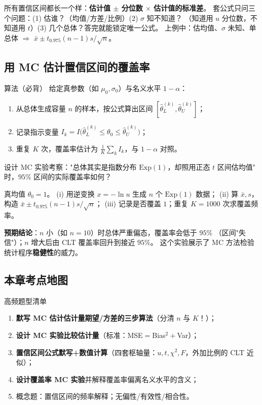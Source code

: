 \begin{pbox}
所有置信区间都长一个样：\textbf{估计值 $\pm$ 分位数 $\times$ 估计值的标准差}。
套公式只问三个问题：(1) 估谁？（均值/方差/比例）(2) $\sigma$ 知不知道？
（知道用 $u$ 分位数，不知道用 $t$）(3) 几个总体？答完就能锁定唯一公式。
上例中：估均值、$\sigma$ 未知、单总体 $\Rightarrow$ $\bar x\pm t_{0.975}(n-1)s/\sqrt n$。
\end{pbox}

\subsection{用 MC 估计置信区间的覆盖率}

\begin{ebox}{算法（必背）}
给定真参数（如 $\mu_0,\sigma_0$）与名义水平 $1-\alpha$：
\begin{enumerate}[leftmargin=2em]
  \item 从总体生成容量 $n$ 的样本，按公式算出区间 $[\hat\theta_L^{(k)},\hat\theta_U^{(k)}]$；
  \item 记录指示变量 $I_k=I\big(\hat\theta_L^{(k)}\le\theta_0\le\hat\theta_U^{(k)}\big)$；
  \item 重复 $K$ 次，覆盖率估计为 $\frac1K\sum_k I_k$，与 $1-\alpha$ 对照。
\end{enumerate}
\end{ebox}

\begin{exbox}
设计 MC 实验考察："总体其实是指数分布 $\mathrm{Exp}(1)$，却照用正态 $t$ 区间估均值"
时，$95\%$ 区间的实际覆盖率如何？
\end{exbox}
\begin{sol}
真均值 $\theta_0=1$。
(i) 用逆变换 $x=-\ln u$ 生成 $n$ 个 $\mathrm{Exp}(1)$ 数据；
(ii) 算 $\bar x,s$，构造 $\bar x\pm t_{0.975}(n-1)s/\sqrt n$；
(iii) 记录是否覆盖 $1$；重复 $K=1000$ 次求覆盖频率。

\textbf{预期结论}：$n$ 小（如 $n=10$）时总体严重偏态，覆盖率会低于 $95\%$
（区间"失信"）；$n$ 增大后由 CLT 覆盖率回升到接近 $95\%$。
这个实验展示了 MC 方法检验统计程序\textbf{稳健性}的威力。
\end{sol}

\subsection{本章考点地图}

\begin{ebox}{高频题型清单}
\begin{enumerate}[leftmargin=2em]
  \item \textbf{默写 MC 估计估计量期望/方差的三步算法}（分清 $n$ 与 $K$！）；
  \item \textbf{设计 MC 实验比较估计量}（标准：MSE$=$Bias$^2+$Var）；
  \item \textbf{置信区间公式默写+数值计算}（四套枢轴量：$u,t,\chi^2,F$，外加比例的 CLT 近似）；
  \item \textbf{设计覆盖率 MC 实验}并解释覆盖率偏离名义水平的含义；
  \item 概念题：置信区间的频率解释；无偏性/有效性/相合性。
\end{enumerate}
\end{ebox}
